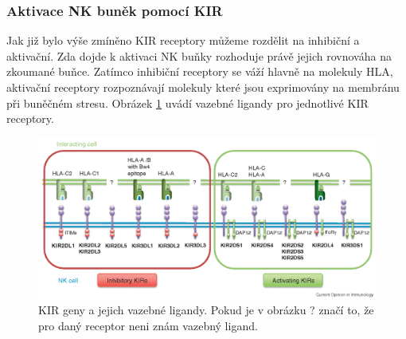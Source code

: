 \documentclass[czech,DP]{thesiskiv}
\numberwithin{equation}{section}
\begin{document}
\subsubsection{Aktivace NK buněk pomocí KIR}
Jak již bylo výše zmíněno KIR receptory můžeme rozdělit na inhibiční a aktivační. Zda dojde k aktivaci NK buňky rozhoduje právě jejich rovnováha na zkoumané buňce. Zatímco inhibiční receptory se váží hlavně na molekuly HLA, aktivační receptory rozpoznávají molekuly které jsou exprimovány na membránu při buněčném stresu. Obrázek \ref{fig:img_kir_ligand} uvádí vazebné ligandy pro jednotlivé KIR receptory.  

\begin{figure}[H]		
		\centering
		\includegraphics[width=\textwidth]{./img/KIR_nomenklatura2.png}
		\caption{KIR geny a jejich vazebné ligandy. Pokud je v obrázku ? značí to, že pro daný receptor neni znám vazebný ligand. \cite{KIR_img_nomenklatura}}
		\label{fig:img_kir_ligand}
\end{figure}
\end{document}
